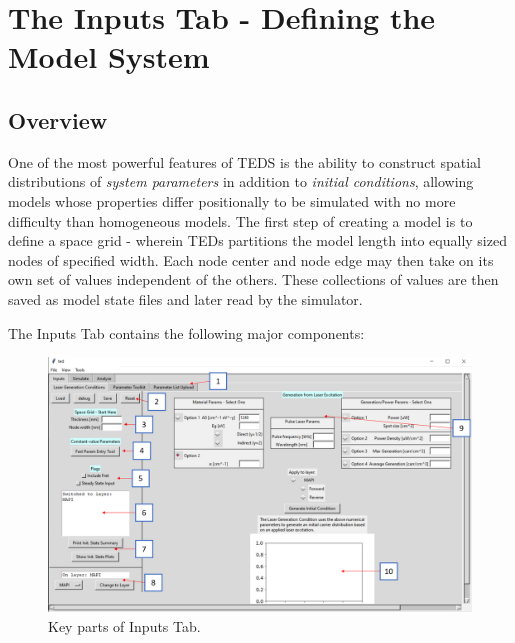 \documentclass[11pt,letterpaper,titlepage]{article}
\begin{document}
	\newpage
	\section{The Inputs Tab - Defining the Model System}
		\subsection{Overview}
		    \par
		    One of the most powerful features of TEDS is the ability to construct spatial distributions of \textit{system parameters} in addition to \textit{initial conditions}, allowing models whose properties differ positionally to be simulated with no more difficulty than homogeneous models. The first step of creating a model is to define a space grid - wherein TEDs partitions the model length into equally sized nodes of specified width. Each node center and node edge may then take on its own set of values independent of the others. These collections of values are then saved as model state files and later read by the simulator.
			\par
			The Inputs Tab contains the following major components:
			
			\begin{figure}[H]
				\label{fig:labeled_main_interface}
				\centering
				\includegraphics[scale=0.4]{"labeled_main_interface"}
				\caption{Key parts of Inputs Tab.}
			\end{figure}
		
\end{document}
